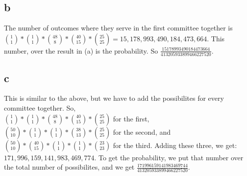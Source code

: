 \documentclass[12pt]{article}
\begin{document}
\subsection*{b}
The number of outcomes where they serve in the first committee together is
\(\binom{1}{1}*\binom{1}{1}*\binom{48}{8}*\binom{40}{15}*\binom{25}{25} = 15,178,993,490,184,473,664\). This number, over the result in (a) is the probability. So \(\frac{15178993490184473664}{413205933899466227520}\).
\subsection*{c}
This is similar to the above, but we have to add the possibilites for every committee together. So,\\
\(\binom{1}{1}*\binom{1}{1}*\binom{48}{8}*\binom{40}{15}*\binom{25}{25}\) for the first,\\
\(\binom{50}{10}*\binom{1}{1}*\binom{1}{1}*\binom{38}{13}*\binom{25}{25}\) for the second, and\\
\(\binom{50}{10}*\binom{40}{15}*\binom{1}{1}*\binom{1}{1}*\binom{23}{23}\) for the third. Adding these three, we get:\\
\(171,996,159,141,983,469,774\). To get the probability, we put that number over the total number of possibilites, and we get \(\frac{171996159141983469744}{413205933899466227520}\).

\section{}
\end{document}
